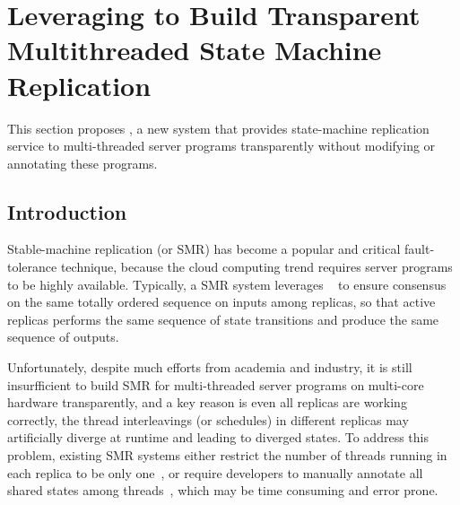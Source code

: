\section{Leveraging \smt to Build Transparent Multithreaded State Machine Replication} \label{sec:replication}

This section proposes \msmr, a new system that provides 
state-machine replication service to multi-threaded server programs 
transparently without modifying or annotating these programs.
   
\subsection{Introduction} \label{sec:rep-intro}


Stable-machine replication (or SMR) has become a popular and critical fault-tolerance 
technique, because the cloud computing trend requires server programs to be 
highly available. Typically, a SMR system leverages \paxos~\cite{paxos} to ensure 
consensus on the same totally ordered sequence on inputs among replicas, so that 
active replicas performs the same sequence of state 
transitions and produce the same sequence of outputs.

Unfortunately, despite much efforts from academia and industry, it is still 
insurfficient to build SMR for multi-threaded server programs on multi-core 
hardware transparently, and a key reason is even all replicas are working 
correctly, the thread interleavings (or schedules) in different replicas may 
artificially diverge at runtime and leading to diverged states. To address this 
problem, existing SMR systems either restrict the number of threads running in each 
replica to be only one~\cite{paxos, pbft:osdi99, mencius:osdi08, saebft:sosp03}, or require developers to manually annotate all shared states 
among threads~\cite{eve:osdi12}, which may be time consuming and error prone.


